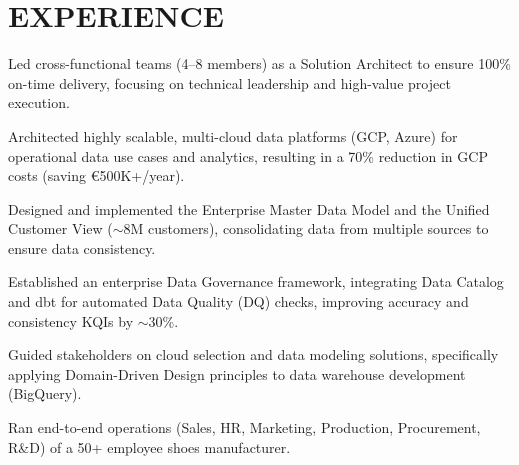 \documentclass[]{deedy-resume-cv}
\begin{document}
\begin{minipage}[t]{0.60\textwidth}


\section{EXPERIENCE}

\vspace{\topsep} %
\begin{tightemize}
\item Led cross-functional teams (4–8 members) as a Solution Architect to ensure 100\% on-time delivery, focusing on technical leadership and high-value project execution.

\item Architected highly scalable, multi-cloud data platforms (GCP, Azure) for operational data use cases and analytics, resulting in a 70\% reduction in GCP costs (saving €500K+/year).

\item Designed and implemented the Enterprise Master Data Model and the Unified Customer View ($\sim$8M customers), consolidating data from multiple sources to ensure data consistency.

\item Established an enterprise Data Governance framework, integrating Data Catalog and dbt for automated Data Quality (DQ) checks, improving accuracy and consistency KQIs by $\sim$30\%.

\item Guided stakeholders on cloud selection and data modeling solutions, specifically applying Domain-Driven Design principles to data warehouse development (BigQuery).
\end{tightemize}

\sectionsep
{}
\begin{tightemize}
\item Ran end-to-end operations (Sales, HR, Marketing, Production, Procurement, R\&D) of a 50+ employee shoes manufacturer.


\end{tightemize}
\end{minipage}
\end{document}
